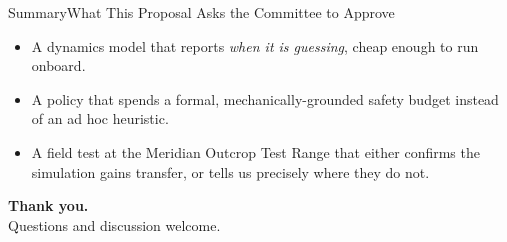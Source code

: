 \begin{frame}{Summary}{What This Proposal Asks the Committee to Approve}
  \begin{itemize}
    \item A dynamics model that reports \emph{when it is guessing}, cheap
      enough to run onboard.
    \item A policy that spends a formal, mechanically-grounded safety
      budget instead of an ad hoc heuristic.
    \item A field test at the Meridian Outcrop Test Range that either
      confirms the simulation gains transfer, or tells us precisely where
      they do not.
  \end{itemize}
  \par\vspace{10pt}
  \begin{center}
    \Large\color{navy}\textbf{Thank you.}\\[4pt]
    \normalsize\color{slate} Questions and discussion welcome.
  \end{center}
\end{frame}
